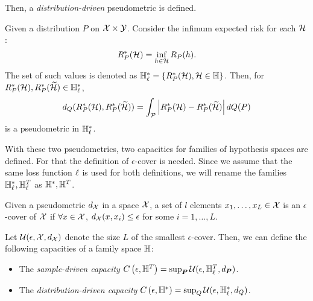 Then, a \emph{distribution-driven} pseudometric is defined. 
\begin{definition}
    \label{def:dist_pseudometric}
    Given a distribution $P$ on $\mathcal{X} \times \mathcal{Y}$. Consider the infimum expected risk for each $\mathcal{H}$:
\begin{equation}
    \nonumber
    R^*_P(\mathcal{H}) = \inf_{h \in \mathcal{H}} R_P(h).
\end{equation}
The set of such values is denoted as 
$\mathbb{H}^{*}_\ell = \left\{R^*_P(\mathcal{H}), \mathcal{H} \in \mathbb{H}\right\}$.
Then, for $R^*_P(\mathcal{H}), R^*_P(\widetilde{\mathcal{H}}) \in \mathbb{H}_\ell^*$,
\begin{equation}
    \nonumber
    d_{Q}(R^*_P(\mathcal{H}), R^*_P(\widetilde{\mathcal{H}})) = \int_{\mathcal{P}} \left|R^*_P(\mathcal{H}) - R^*_P(\widetilde{\mathcal{H}})\right| dQ(P)
\end{equation}
is a pseudometric in $\mathbb{H}_\ell^*$.
\end{definition}
With these two pseudometrics, two capacities for families of hypothesis spaces are defined. For that the definition of $\epsilon$-cover is needed. 
Since we assume that the same loss function $\ell$ is used for both definitions, we will rename the families $\mathbb{H}^*_\ell, \mathbb{H}^T_\ell$ as $\mathbb{H}^*, \mathbb{H}^T$.
\begin{definition}
    \label{def:epsilon_cover}
    Given a pseudometric $d_{\mathcal{X}}$ in a space $\mathcal{X}$, 
a set of $l$ elements $x_1, \ldots, x_L \in \mathcal{X}$ is an $\epsilon$-cover of $\mathcal{X}$ if 
$ \forall x \in \mathcal{X}$, $d_{\mathcal{X}}(x, x_i) \leq \epsilon $
for some $i=1, \ldots, L$.
\end{definition}
%
Let $\mathcal{U}(\epsilon, \mathcal{X}, d_{\mathcal{X}})$ denote the size $L$ of the smallest $\epsilon$-cover.
Then, we can define the following capacities of a family space $\mathbb{H}$:
\begin{itemize}
    \item The \emph{sample-driven capacity} $C\left(\epsilon, \mathbb{H}^{T}\right) = \sup_{\bm{P}} \mathcal{U}(\epsilon, \mathbb{H}_\ell^T, d_{\bm{P}})$.
    \item The \emph{distribution-driven capacity} $C\left(\epsilon, \mathbb{H}^{*}\right) = \sup_Q \mathcal{U}(\epsilon, \mathbb{H}^{*}_\ell, d_{Q})$.
\end{itemize}

